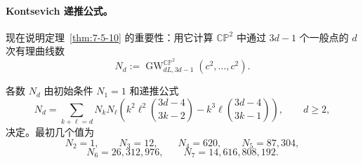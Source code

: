 \paragraph{Kontsevich 递推公式。}
现在说明定理~\ref{thm:7-5-10} 的重要性：用它计算 $\mathbb{CP}^2$ 中通过
$3d-1$ 个一般点的 $d$ 次有理曲线数
\[
  N_d:=\operatorname{GW}_{dL,3d-1}^{\mathbb{CP}^2}
       (c^2,\ldots,c^2).
\]

\begin{proposition}[Kontsevich]\label{prop:7-5-11}
各数 $N_d$ 由初始条件 $N_1=1$ 和递推公式
\begin{equation}\label{eq:7-5-2}
  N_d=\sum_{k+\ell=d}N_kN_\ell
  \left(
    k^2\ell^2\binom{3d-4}{3k-2}
    -k^3\ell\binom{3d-4}{3k-1}
  \right),
  \qquad d\ge2,
\end{equation}
决定。最初几个值为
\[
  N_2=1,\qquad N_3=12,\qquad N_4=620,\qquad N_5=87{,}304,
\]
\[
  N_6=26{,}312{,}976,\qquad N_7=14{,}616{,}808{,}192.
\]
\end{proposition}


